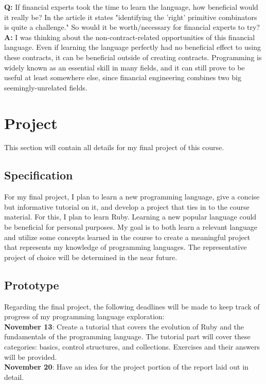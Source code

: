 \documentclass{article}
\theoremstyle{theorem}
\theoremstyle{definition}
\theoremstyle{remark}
\begin{document}
\textbf{Q:} If financial experts took the time to learn the language, how beneficial would it really be? In the article it states "identifying the 'right' primitive combinators is quite a challenge." So would it be worth/necessary for financial experts to try? \\

\textbf{A:} I was thinking about the non-contract-related opportunities of this financial language. Even if learning the language perfectly had no beneficial effect to using these contracts, it can be beneficial outside of creating contracts. Programming is widely known as an essential skill in many fields, and it can still prove to be useful at least somewhere else, since financial engineering combines two big seemingly-unrelated fields.


\section{Project}
This section will contain all details for my final project of this course.
\subsection{Specification}
For my final project, I plan to learn a new programming language, give a concise but informative tutorial on it, and develop a project that ties in to the course material. For this, I plan to learn Ruby. Learning a new popular language could be beneficial for personal purposes. My goal is to both learn a relevant language and utilize some concepts learned in the course to create a meaningful project that represents my knowledge of programming languages. The representative project of choice will be determined in the near future.
\subsection{Prototype}
Regarding the final project, the following deadlines will be made to keep track of progress of my programming language exploration:\\

\noindent \textbf{November 13}: Create a tutorial that covers the evolution of Ruby and the fundamentals of the programming language. The tutorial part will cover these categories: basics, control structures, and collections. Exercises and their answers will be provided.\\

\noindent \textbf{November 20}: Have an idea for the project portion of the report laid out in detail.\\
\end{document}
